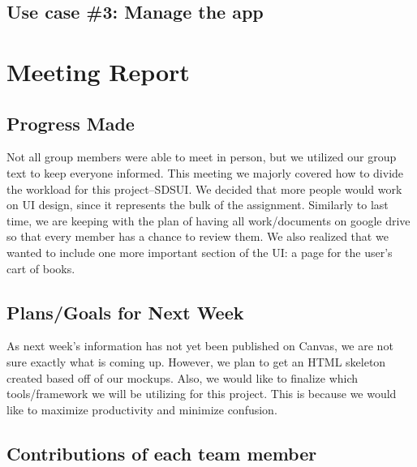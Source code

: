 \documentclass[12pt]{article}
\begin{document}
		\subsection{Use case \#3: Manage the app}


	\section{Meeting Report}
		\subsection{Progress Made}
			Not all group members were able to meet in person, but we utilized our group text to keep everyone informed. 
			This meeting we majorly covered how to divide the workload for this project--SDSUI. 
			We decided that more people would work on UI design, since it represents the bulk of the assignment. 
			Similarly to last time, we are keeping with the plan of having all work/documents on google drive so that every member has a chance to review them. 
			We also realized that we wanted to include one more important section of the UI: a page for the user’s cart of books.


		\subsection{Plans/Goals for Next Week}

		As next week’s information has not yet been published on Canvas, we are not sure exactly what is coming up. 
		However, we plan to get an HTML skeleton created based off of our mockups. 
		Also, we would like to finalize which tools/framework we will be utilizing for this project. 
		This is because we would like to maximize productivity and minimize confusion.

		\subsection{Contributions of each team member}
\end{document}
